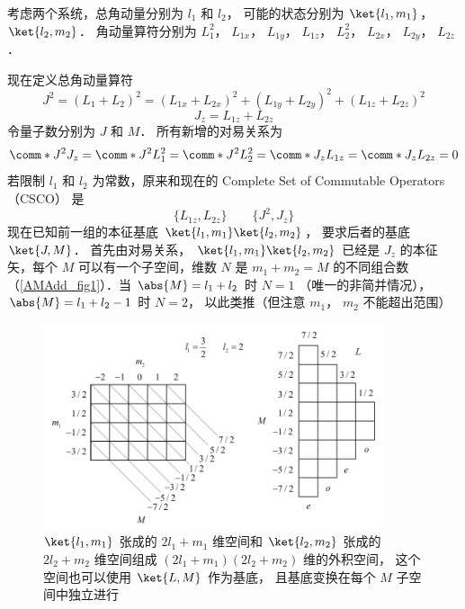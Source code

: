 
考虑两个系统，总角动量分别为 $l_1$  和 $l_2$， 可能的状态分别为 $\ket{l_1, m_1}$， $\ket{l_2, m_2}$． 角动量算符分别为 $L_1^2$， $L_{1x}$， $L_{1y}$， $L_{1z}$， $L_2^2$， $L_{2x}$， $L_{2y}$， $L_{2z}$．  

现在定义总角动量算符
\begin{equation}
J^2 = (L_1 + L_2)^2 = (L_{1x} + L_{2x})^2 + (L_{1y} + L_{2y})^2 + (L_{1z} + L_{2z})^2
\end{equation}
\begin{equation}
J_z = L_{1z} + L_{2z}
\end{equation}
令量子数分别为 $J$  和 $M$．  所有新增的对易关系为
\begin{equation}
\comm*{J^2}{J_z} = \comm*{J^2}{L_1^2} = \comm*{J^2}{L_2^2} = 
\comm*{J_z}{L_{1z}} = \comm*{J_z}{L_{2z}} = 0
\end{equation}
若限制  $l_1$ 和 $l_2$ 为常数，原来和现在的 Complete Set of Commutable Operators （CSCO） 是
\begin{equation}
\{L_{1z}, L_{2z}\} \qquad \{J^2, J_z\}
\end{equation}
现在已知前一组的本征基底 $\ket{l_1, m_1} \ket{l_2, m_2}$，  要求后者的基底 $\ket{J, M}$．  首先由对易关系， $\ket{l_1, m_1} \ket{l_2, m_2}$ 已经是 $J_z$ 的本征矢，每个 $M$ 可以有一个子空间，维数 $N$ 是 $m_1 + m_2 = M$ 的不同组合数（\autoref{AMAdd_fig1}）．当 $\abs{M} = l_1 + l_2$ 时 $N = 1$ （唯一的非简并情况）， $\abs{M} = l_1 + l_2 - 1$ 时 $N = 2$， 以此类推（但注意 $m_1$， $m_2$ 不能超出范围）

\begin{figure}[ht]
\centering
\includegraphics[width=10cm]{./figures/AMAdd1.pdf}
\caption{$\ket{l_1, m_1}$ 张成的 $2l_1+m_1$ 维空间和 $\ket{l_2, m_2}$ 张成的 $2l_2+m_2$ 维空间组成 $(2l_1+m_1)(2l_2+m_2)$ 维的外积空间， 这个空间也可以使用 $\ket{L, M}$ 作为基底， 且基底变换在每个 $M$ 子空间中独立进行} \label{AMAdd_fig1}
\end{figure}

